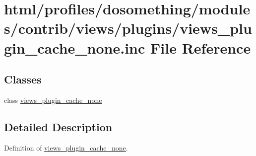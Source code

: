 \hypertarget{views__plugin__cache__none_8inc}{
\section{html/profiles/dosomething/modules/contrib/views/plugins/views\_\-plugin\_\-cache\_\-none.inc File Reference}
\label{views__plugin__cache__none_8inc}
}
\subsection*{Classes}
\begin{DoxyCompactItemize}
\item 
class \hyperlink{classviews__plugin__cache__none}{views\_\-plugin\_\-cache\_\-none}
\end{DoxyCompactItemize}


\subsection{Detailed Description}
Definition of \hyperlink{classviews__plugin__cache__none}{views\_\-plugin\_\-cache\_\-none}. 